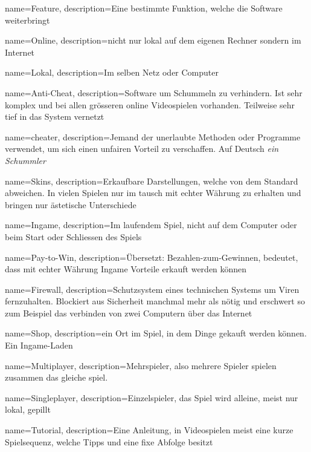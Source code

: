 {
  name={Feature},
  description={Eine bestimmte Funktion, welche die Software weiterbringt}
}

{
  name={Online},
  description={nicht nur lokal auf dem eigenen Rechner sondern im Internet}
}

{
  name={Lokal},
  description={Im selben Netz oder Computer}
}

{
  name={Anti-Cheat},
  description={Software um Schummeln zu verhindern.
  Ist sehr komplex und bei allen grösseren online Videospielen vorhanden.
  Teilweise sehr tief in das System vernetzt}
}

{
  name={cheater},
  description={Jemand der unerlaubte Methoden oder Programme verwendet, um sich einen unfairen Vorteil zu verschaffen.
  Auf Deutsch \textit{ein Schummler}}
}

{
  name={Skins},
  description={Erkaufbare Darstellungen, welche von dem Standard abweichen.
  In vielen Spielen nur im tausch mit echter Währung zu erhalten und bringen nur ästetische Unterschiede}
}

{
  name={Ingame},
  description={Im laufendem Spiel, nicht auf dem Computer oder beim Start oder Schliessen des Spiels}
}

{
  name={Pay-to-Win},
  description={Übersetzt: Bezahlen-zum-Gewinnen, bedeutet, dass mit echter Währung Ingame Vorteile erkauft werden können}
}

{
  name={Firewall},
  description={Schutzsystem eines technischen Systems um Viren fernzuhalten.
  Blockiert aus Sicherheit manchmal mehr als nötig und erschwert so zum Beispiel das verbinden von zwei Computern über das Internet}
}

{
  name={Shop},
  description={ein Ort im Spiel, in dem Dinge gekauft werden können. Ein Ingame-Laden}
}


{
  name={Multiplayer},
  description={Mehrspieler, also mehrere Spieler spielen zusammen das gleiche spiel.}
}

{
  name={Singleplayer},
  description={Einzelspieler, das Spiel wird alleine, meist nur lokal, gepillt}
}

{
  name={Tutorial},
  description={Eine Anleitung, in Videospielen meist eine kurze Spielsequenz, welche Tipps und eine fixe Abfolge besitzt}
}

